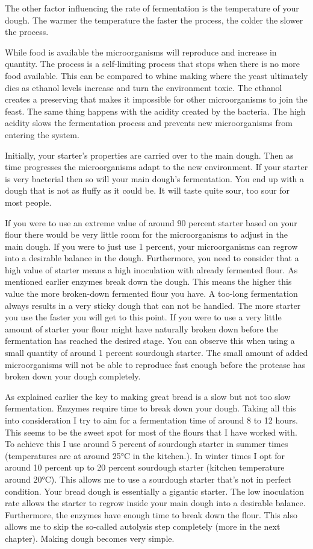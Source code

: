 The other factor influencing the rate of fermentation is the temperature of
your dough. The warmer the temperature the faster the process, the colder the
slower the process.

While food is available the microorganisms will reproduce and increase in
quantity. The process is a self-limiting process that stops when there is no
more food available. This can be compared to whine making where
the yeast ultimately dies as ethanol levels increase and turn the environment
toxic. The ethanol creates a preserving that makes it impossible for other
microorganisms to join the feast. The same thing happens with the acidity
created by the bacteria. The high acidity slows the fermentation process and
prevents new microorganisms from entering the system.

Initially, your starter's properties are carried over to the main dough. Then
as time progresses the microorganisms adapt to the new environment. If your
starter is very bacterial then so will your main dough's fermentation. You
end up with a dough that is not as fluffy as it could be. It will taste quite
sour, too sour for most people.

If you were to use an extreme value of around 90 percent starter based on your flour there
would be very little room for the microorganisms to adjust in the main dough.
If you were to just use 1 percent, your microorganisms can regrow into a
desirable balance in the dough. Furthermore, you need to consider that a high value
of starter means a high inoculation with already fermented flour. As
mentioned earlier enzymes break down the dough. This means the higher this
value the more broken-down fermented flour you have. A too-long fermentation
always results in a very sticky dough that can not be handled. The more
starter you use the faster you will get to this point. If you were to use a
very little amount of starter your flour might have naturally broken down
before the fermentation has reached the desired stage. You can observe this
when using a small quantity of around 1 percent sourdough starter. The small
amount of added microorganisms will not be able to reproduce fast enough
before the protease has broken down your dough completely.

As explained earlier the key to making great bread is a slow but not too slow
fermentation. Enzymes require time to break down your dough. Taking all this
into consideration I try to aim for a fermentation time of around 8 to 12 hours. This seems to be
the sweet spot for most of the flours that I have worked with. To achieve this
I use around 5 percent of sourdough starter in summer times (temperatures are
at around 25°C in the kitchen.). In winter times I opt for around 10 percent
up to 20 percent sourdough starter (kitchen temperature around 20°C). This
allows me to use a sourdough starter that's not in perfect condition. Your
bread dough is essentially a gigantic starter. The low inoculation rate allows
the starter to regrow inside your main dough into a desirable balance.
Furthermore, the enzymes have enough time to break down the flour. This also
allows me to skip the so-called autolysis step completely (more in the next chapter).
 Making dough becomes very simple.

